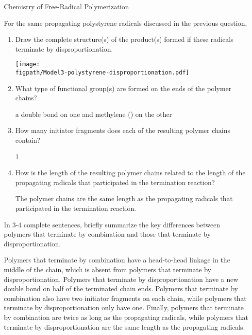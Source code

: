 \begin{activity}{Chemistry of Free-Radical Polymerization}
\begin{ctqs}
\begin{enumerate}
		\end{enumerate}
		
	\question For the same propagating polystyrene radicals discussed in the previous question,
	
		\begin{enumerate}
			\item Draw the complete structure(s) of the product(s) formed if these radicals terminate by disproportionation.
	
				\begin{solution}[1.5in]{}
					\centerline{\texttt{[image: \\figpath/Model3-polystyrene-disproportionation.pdf]}}
				\end{solution}
			
			\item What type of functional group(s) are formed on the ends of the polymer chains?
	
				\begin{solution}[0.5in]{}
					a double bond on one and methylene () on the other
				\end{solution}
			
			\item How many initiator fragments does each of the resulting polymer chains contain?
	
				\begin{solution}[0.5in]{}
					1
				\end{solution}
			
			\item How is the length of the resulting polymer chains related to the length of the propagating radicals that participated in the termination reaction?
	
				\begin{solution}[0.5in]{}
					The polymer chains are the same length as the propagating radicals that participated in the termination reaction.
				\end{solution}
				
		\end{enumerate}
	
	\question In 3-4 complete sentences, briefly summarize the key differences between polymers that terminate by combination and those that terminate by disproportionation.
	
				\begin{solution}[2.75in]{}
					Polymers that terminate by combination have a head-to-head linkage in the middle of the chain, which is absent from polymers that terminate by disproportionation.  Polymers that terminate by disproportionation have a new double bond on half of the terminated chain ends.  Polymers that terminate by combination also have two initiator fragments on each chain, while polymers that terminate by disproportionation only have one.  Finally, polymers that terminate by combination are twice as long as the propagating radicals, while polymers that terminate by disproportionation are the same length as the propagating radicals.
				\end{solution}
	


\end{ctqs}
\end{activity}
